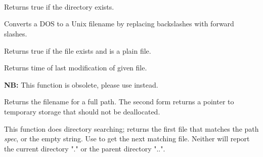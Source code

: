 \\
\\
\\


\label{functionwxdirexists}


Returns true if the directory exists.


\label{wxdos2unixfilename}


Converts a DOS to a Unix filename by replacing backslashes with forward
slashes.


\label{functionwxfileexists}


Returns true if the file exists and is a plain file.


\label{wxfilemodificationtime}


Returns time of last modification of given file.


\label{wxfilenamefrompath}



{\bf NB:} This function is obsolete, please use
 instead.

Returns the filename for a full path. The second form returns a pointer to
temporary storage that should not be deallocated.


\label{wxfindfirstfile}


This function does directory searching; returns the first file
that matches the path {\it spec}, or the empty string. Use  to
get the next matching file. Neither will report the current directory "." or the
parent directory "..".

